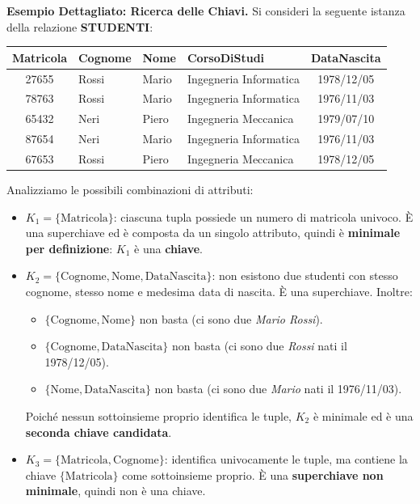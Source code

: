 \documentclass[12pt]{extarticle}
\begin{document}
\medskip
\noindent \textbf{Esempio Dettagliato: Ricerca delle Chiavi.} Si consideri la seguente istanza della relazione \textbf{STUDENTI}:
\begin{center}
\small
\begin{tabular}{clllc}
    \toprule
    \textbf{Matricola} & \textbf{Cognome} & \textbf{Nome} & \textbf{CorsoDiStudi} & \textbf{DataNascita} \\
    \midrule
    27655 & Rossi & Mario & Ingegneria Informatica & 1978/12/05 \\
    78763 & Rossi & Mario & Ingegneria Informatica & 1976/11/03 \\
    65432 & Neri & Piero & Ingegneria Meccanica & 1979/07/10 \\
    87654 & Neri & Mario & Ingegneria Informatica & 1976/11/03 \\
    67653 & Rossi & Piero & Ingegneria Meccanica & 1978/12/05 \\
    \bottomrule
\end{tabular}
\end{center}
\medskip
\noindent Analizziamo le possibili combinazioni di attributi:
\begin{itemize}
    \item $K_1 = \{\text{Matricola}\}$: ciascuna tupla possiede un numero di matricola univoco. È una superchiave ed è composta da un singolo attributo, quindi è \textbf{minimale per definizione}: $K_1$ è una \textbf{chiave}.
    \item $K_2 = \{\text{Cognome}, \text{Nome}, \text{DataNascita}\}$: non esistono due studenti con stesso cognome, stesso nome e medesima data di nascita. È una superchiave. Inoltre:
    \begin{itemize}
        \item $\{\text{Cognome}, \text{Nome}\}$ non basta (ci sono due \textit{Mario Rossi}).
        \item $\{\text{Cognome}, \text{DataNascita}\}$ non basta (ci sono due \textit{Rossi} nati il 1978/12/05).
        \item $\{\text{Nome}, \text{DataNascita}\}$ non basta (ci sono due \textit{Mario} nati il 1976/11/03).
    \end{itemize}
    Poiché nessun sottoinsieme proprio identifica le tuple, $K_2$ è minimale ed è una \textbf{seconda chiave candidata}.
    \item $K_3 = \{\text{Matricola}, \text{Cognome}\}$: identifica univocamente le tuple, ma contiene la chiave $\{\text{Matricola}\}$ come sottoinsieme proprio. È una \textbf{superchiave non minimale}, quindi non è una chiave.
\end{itemize}
\end{document}
